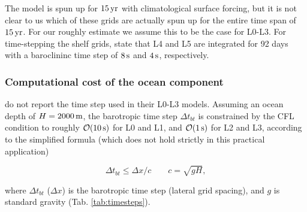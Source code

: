 \documentclass[12pt,a4paper]{article}
\begin{document}

The model is spun up for $15\,\rm yr$ with climatological surface forcing, but it is not clear to us which of these grids are actually spun up for the entire time span of $15\,\rm yr$. For our roughly estimate we assume this to be the case for L0-L3. For time-stepping the shelf grids, \cite{kumar2015midshelf} state that L4 and L5 are integrated for 92 days with a baroclininc time step of $8\,\rm s$ and $4\,\rm s$, respectively.



\subsubsection{Computational cost of the ocean component}

\cite{kumar2015midshelf} do not report the time step used in their L0-L3 models. Assuming an ocean depth of $H=2000\,\rm m$, the barotropic time step $\Delta t_{bt}$ is constrained by the CFL condition to roughly $\mathcal{O}(10\,\rm s)$ for L0 and L1, and $\mathcal{O}(1\,\rm s)$ for L2 and L3, according to the simplified formula (which does not hold strictly in this practical application)

\begin{equation}\label{eq:cfl}
\Delta t_{bt}\leq\Delta x/c \qquad c=\sqrt{gH},
\end{equation}

where $\Delta t_{bt}$ ($\Delta x$) is the barotropic time step (lateral grid spacing), and $g$ is standard gravity (Tab. \ref{tab:timesteps}). 
\end{document}
